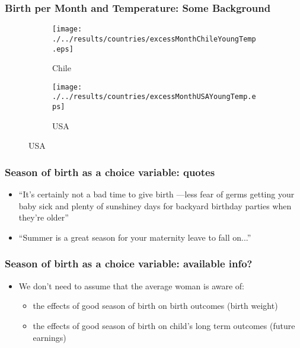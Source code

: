 \documentclass[10pt,letterpaper,subeqn]{beamer}
\begin{document}
\begin{frame}
  \frametitle{Birth per Month and Temperature: Some Background}
  \begin{figure}[htpb!]
    \begin{center}
      \begin{subfigure}{.5\textwidth}
        \centering
        \texttt{[image: ./../results/countries/excessMonthChileYoungTemp.eps]}
        \caption{Chile}
        \label{fig:ChileTemp}
      \end{subfigure}%
      \begin{subfigure}{.5\textwidth}
        \centering
        \texttt{[image: ./../results/countries/excessMonthUSAYoungTemp.eps]}
        \caption{USA}
        \label{fig:USATemp}
      \end{subfigure}
    \end{center}
  \end{figure}
\end{frame}

\begin{frame}
\frametitle{Season of birth as a choice variable: quotes}
\begin{itemize}
\item ``It's certainly not a bad time to give birth ---less fear of germs getting your baby sick and plenty of sunshiney days for backyard birthday parties when they're older''
\item ``Summer is a great season for your maternity leave to fall on...''
\end{itemize}
\end{frame}


\begin{frame}
\frametitle{Season of birth as a choice variable: available info?}
\begin{itemize}
\item We don't need to assume that the average woman is aware of:
 \begin{itemize}
\item the effects of good season of birth on birth outcomes (birth weight)
\item the effects of good season of birth on child's long term outcomes (future earnings)
  \end{itemize}
\end{itemize}
\end{frame}
\end{document}
